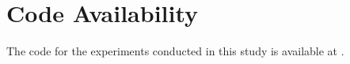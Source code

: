 \section{Code Availability}
\label{sec:code}
The code for the experiments conducted in this study is available at \url{}.